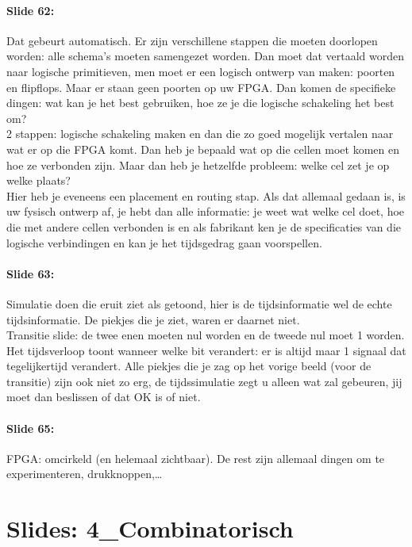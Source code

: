 \documentclass[10pt,a4paper]{book}
\begin{document}
\paragraph{Slide 62:} Dat gebeurt automatisch. Er zijn verschillene stappen die moeten doorlopen worden: alle schema's moeten samengezet worden. Dan moet dat vertaald worden naar logische primitieven, men moet er een logisch ontwerp van maken: poorten en flipflops. Maar er staan geen poorten op uw FPGA. Dan komen de specifieke dingen: wat kan je het best gebruiken, hoe ze je die logische schakeling het best om? \\
2 stappen: logische schakeling maken en dan die zo goed mogelijk vertalen naar wat er op die FPGA komt. Dan heb je bepaald wat op die cellen moet komen en hoe ze verbonden zijn. Maar dan heb je hetzelfde probleem: welke cel zet je op welke plaats?\\
Hier heb je eveneens een placement en routing stap. Als dat allemaal gedaan is, is uw fysisch ontwerp af, je hebt dan alle informatie: je weet wat welke cel doet, hoe die met andere cellen verbonden is en als fabrikant ken je de specificaties van die logische verbindingen en kan je het tijdsgedrag gaan voorspellen.

\paragraph{Slide 63:} Simulatie doen die eruit ziet als getoond, hier is de tijdsinformatie wel de echte tijdsinformatie. De piekjes die je ziet, waren er daarnet niet.\\
Transitie slide: de twee enen moeten nul worden en de tweede nul moet 1 worden. Het tijdsverloop toont wanneer welke bit verandert: er is altijd maar 1 signaal dat tegelijkertijd verandert. Alle piekjes die je zag op het vorige beeld (voor de transitie) zijn ook niet zo erg, de tijdssimulatie zegt u alleen wat zal gebeuren, jij moet dan beslissen of dat OK is of niet. 

\paragraph{Slide 65:} FPGA: omcirkeld (en helemaal zichtbaar). De rest zijn allemaal dingen om te experimenteren, drukknoppen,\ldots

\section{Slides: 4\_Combinatorisch}
\end{document}

